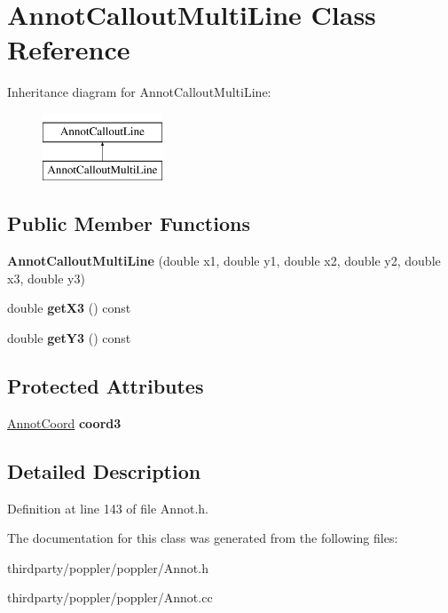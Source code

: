 \hypertarget{class_annot_callout_multi_line}{}\section{Annot\+Callout\+Multi\+Line Class Reference}
\label{class_annot_callout_multi_line}
Inheritance diagram for Annot\+Callout\+Multi\+Line\+:\begin{figure}[H]
\begin{center}
\leavevmode
\includegraphics[height=2.000000cm]{class_annot_callout_multi_line}
\end{center}
\end{figure}
\subsection*{Public Member Functions}
\begin{DoxyCompactItemize}
\item 
\mbox{\label{class_annot_callout_multi_line_a8cb8df8bb4085c3dd96b6d33c03fe9fc}} 
{\bfseries Annot\+Callout\+Multi\+Line} (double x1, double y1, double x2, double y2, double x3, double y3)
\item 
\mbox{\label{class_annot_callout_multi_line_a10dd07cee340ab86f6ba2e72340a1c89}} 
double {\bfseries get\+X3} () const
\item 
\mbox{\label{class_annot_callout_multi_line_ac89cacf6f6e02584b9b7cbb215d45e97}} 
double {\bfseries get\+Y3} () const
\end{DoxyCompactItemize}
\subsection*{Protected Attributes}
\begin{DoxyCompactItemize}
\item 
\mbox{\label{class_annot_callout_multi_line_a3cebe9d3927f4e51c84a7a8497e141b9}} 
\hyperlink{class_annot_coord}{Annot\+Coord} {\bfseries coord3}
\end{DoxyCompactItemize}


\subsection{Detailed Description}


Definition at line 143 of file Annot.\+h.



The documentation for this class was generated from the following files\+:\begin{DoxyCompactItemize}
\item 
thirdparty/poppler/poppler/Annot.\+h\item 
thirdparty/poppler/poppler/Annot.\+cc\end{DoxyCompactItemize}
